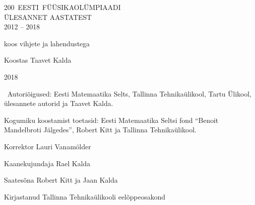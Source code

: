 \documentclass[11pt]{article}
\begin{document}
\begin{titlepage}
	\centering
	\vspace{10cm}
	{\sffamily\Huge \mbox{200 EESTI FÜÜSIKAOLÜMPIAADI}\\ ÜLESANNET AASTATEST\\ 2012 -- 2018\par}
	\vspace{1cm}
	{\Large koos vihjete ja lahendustega\par}
	\vfill
	{\Large Koostas Taavet Kalda}

	\vfill

	{\large 2018}
\end{titlepage}

\addtocounter{page}{1}
\mbox{}\vfill

\textcopyright~Autoriõigused: Eesti Matemaatika Selts, Tallinna Tehnikaülikool,
Tartu Ülikool, ülesannete autorid ja Taavet Kalda.
\vspace{0.5\baselineskip}

Kogumiku koostamist toetasid: Eesti Matemaatika Seltsi fond ``Benoit Mandelbroti Jälgedes'', Robert Kitt ja Tallinna Tehnikaülikool.
\vspace{0.5\baselineskip}


Korrektor Lauri Vanamölder

Kaanekujundaja Rael Kalda

Saatesõna Robert Kitt ja Jaan Kalda
\vspace{0.5\baselineskip}

Kirjastanud Tallinna Tehnikaülikooli eelõppeosakond
\newpage
\end{document}
